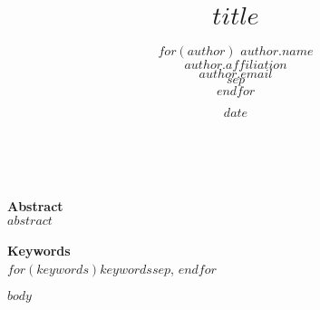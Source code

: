 \documentclass[12pt,titlepage]{mktg-article}
\begin{document}
\title{$title$}
\author{
  $for(author)$
  $author.name$\\
  $author.affiliation$\\
  $author.email$\\
  $sep$ \\ $endfor$
}
\date{$date$}

\maketitle
\doublespacing

\begin{center}
{}\\
\end{center}
\vspace{4mm}
\textbf{Abstract}\\
$abstract$
\\ \\
\noindent \textbf{Keywords}\\ 
$for(keywords)$$keywords$$sep$, $endfor$

\newpage
$body$

\pagebreak


\end{document}
